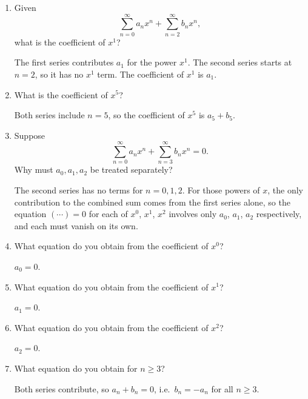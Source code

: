 \documentclass{essay}
\begin{document}
\begin{enumerate}[leftmargin=*, itemsep=8pt]
  \item Given \[ \sum_{n=0}^{\infty} a_n x^n + \sum_{n=2}^{\infty}
    b_n x^n, \] what is the coefficient of \(x^1\)?
    \begin{answer}
      The first series contributes $a_1$ for the power $x^1$. The
      second series starts at $n = 2$, so it has no $x^1$ term. The
      coefficient of $x^1$ is $a_1$.
    \end{answer}

  \item What is the coefficient of \(x^5\)?
    \begin{answer}
      Both series include $n = 5$, so the coefficient of $x^5$ is $a_5 + b_5$.
    \end{answer}

  \item Suppose \[ \sum_{n=0}^{\infty} a_n x^n + \sum_{n=3}^{\infty}
    b_n x^n =0. \] Why must \(a_0,a_1,a_2\) be treated separately?
    \begin{answer}
      The second series has no terms for $n = 0, 1, 2$. For those
      powers of $x$,
      the only contribution to the combined sum comes from the first
      series alone, so
      the equation $(\cdots) = 0$ for each of $x^0$, $x^1$, $x^2$ involves only
      $a_0$, $a_1$, $a_2$ respectively, and each must vanish on its own.
    \end{answer}

  \item What equation do you obtain from the coefficient of \(x^0\)?
    \begin{answer}
      $a_0 = 0$.
    \end{answer}

  \item What equation do you obtain from the coefficient of \(x^1\)?
    \begin{answer}
      $a_1 = 0$.
    \end{answer}

  \item What equation do you obtain from the coefficient of \(x^2\)?
    \begin{answer}
      $a_2 = 0$.
    \end{answer}

  \item What equation do you obtain for \(n \ge 3\)?
    \begin{answer}
      Both series contribute, so $a_n + b_n = 0$, i.e.\ $b_n = -a_n$ for all
      $n \ge 3$.
    \end{answer}


\end{enumerate}
\end{document}
